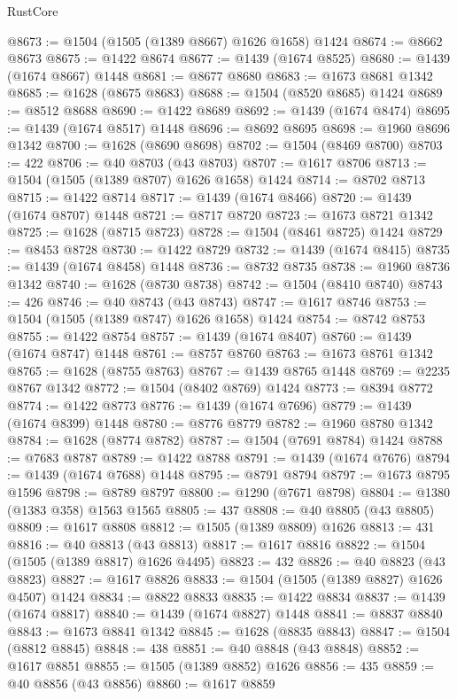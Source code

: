 \begin{lexlean}{RustCore}
\begin{coremodule}
@8673 := @1504 (@1505 (@1389 @8667) @1626 @1658) @1424
@8674 := @8662 @8673
@8675 := @1422 @8674
@8677 := @1439 (@1674 @8525)
@8680 := @1439 (@1674 @8667) @1448
@8681 := @8677 @8680
@8683 := @1673 @8681 @1342
@8685 := @1628 (@8675 @8683)
@8688 := @1504 (@8520 @8685) @1424
@8689 := @8512 @8688
@8690 := @1422 @8689
@8692 := @1439 (@1674 @8474)
@8695 := @1439 (@1674 @8517) @1448
@8696 := @8692 @8695
@8698 := @1960 @8696 @1342
@8700 := @1628 (@8690 @8698)
@8702 := @1504 (@8469 @8700)
@8703 := 422
@8706 := @40 @8703 (@43 @8703)
@8707 := @1617 @8706
@8713 := @1504 (@1505 (@1389 @8707) @1626 @1658) @1424
@8714 := @8702 @8713
@8715 := @1422 @8714
@8717 := @1439 (@1674 @8466)
@8720 := @1439 (@1674 @8707) @1448
@8721 := @8717 @8720
@8723 := @1673 @8721 @1342
@8725 := @1628 (@8715 @8723)
@8728 := @1504 (@8461 @8725) @1424
@8729 := @8453 @8728
@8730 := @1422 @8729
@8732 := @1439 (@1674 @8415)
@8735 := @1439 (@1674 @8458) @1448
@8736 := @8732 @8735
@8738 := @1960 @8736 @1342
@8740 := @1628 (@8730 @8738)
@8742 := @1504 (@8410 @8740)
@8743 := 426
@8746 := @40 @8743 (@43 @8743)
@8747 := @1617 @8746
@8753 := @1504 (@1505 (@1389 @8747) @1626 @1658) @1424
@8754 := @8742 @8753
@8755 := @1422 @8754
@8757 := @1439 (@1674 @8407)
@8760 := @1439 (@1674 @8747) @1448
@8761 := @8757 @8760
@8763 := @1673 @8761 @1342
@8765 := @1628 (@8755 @8763)
@8767 := @1439 @8765 @1448
@8769 := @2235 @8767 @1342
@8772 := @1504 (@8402 @8769) @1424
@8773 := @8394 @8772
@8774 := @1422 @8773
@8776 := @1439 (@1674 @7696)
@8779 := @1439 (@1674 @8399) @1448
@8780 := @8776 @8779
@8782 := @1960 @8780 @1342
@8784 := @1628 (@8774 @8782)
@8787 := @1504 (@7691 @8784) @1424
@8788 := @7683 @8787
@8789 := @1422 @8788
@8791 := @1439 (@1674 @7676)
@8794 := @1439 (@1674 @7688) @1448
@8795 := @8791 @8794
@8797 := @1673 @8795 @1596
@8798 := @8789 @8797
@8800 := @1290 (@7671 @8798)
@8804 := @1380 (@1383 @358) @1563 @1565
@8805 := 437
@8808 := @40 @8805 (@43 @8805)
@8809 := @1617 @8808
@8812 := @1505 (@1389 @8809) @1626
@8813 := 431
@8816 := @40 @8813 (@43 @8813)
@8817 := @1617 @8816
@8822 := @1504 (@1505 (@1389 @8817) @1626 @4495)
@8823 := 432
@8826 := @40 @8823 (@43 @8823)
@8827 := @1617 @8826
@8833 := @1504 (@1505 (@1389 @8827) @1626 @4507) @1424
@8834 := @8822 @8833
@8835 := @1422 @8834
@8837 := @1439 (@1674 @8817)
@8840 := @1439 (@1674 @8827) @1448
@8841 := @8837 @8840
@8843 := @1673 @8841 @1342
@8845 := @1628 (@8835 @8843)
@8847 := @1504 (@8812 @8845)
@8848 := 438
@8851 := @40 @8848 (@43 @8848)
@8852 := @1617 @8851
@8855 := @1505 (@1389 @8852) @1626
@8856 := 435
@8859 := @40 @8856 (@43 @8856)
@8860 := @1617 @8859

\end{coremodule}
\end{lexlean}
